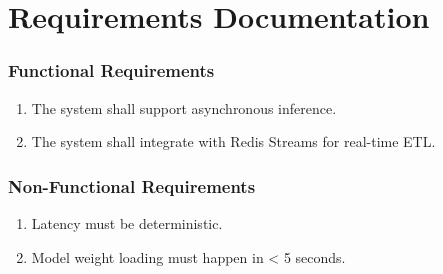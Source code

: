 \documentclass[
]{report}
\author{}
\date{}
\providecommand{\tightlist}{%
  \setlength{\itemsep}{0pt}\setlength{\parskip}{0pt}}
\begin{document}
\newcommand{\theProjectName}{NOAA}
\newcommand{\theAuthor}{Rodrigo Souza dos Santos}

\chapter{Requirements Documentation}\label{requirements-documentation}

\subsection{Functional Requirements}\label{functional-requirements}

\begin{enumerate}
\def\labelenumi{\arabic{enumi}.}
\tightlist
\item
  The system shall support asynchronous inference.
\item
  The system shall integrate with Redis Streams for real-time ETL.
\end{enumerate}

\subsection{Non-Functional
Requirements}\label{non-functional-requirements}

\begin{enumerate}
\def\labelenumi{\arabic{enumi}.}
\tightlist
\item
  Latency must be deterministic.
\item
  Model weight loading must happen in \textless{} 5 seconds.
\end{enumerate}
\end{document}
